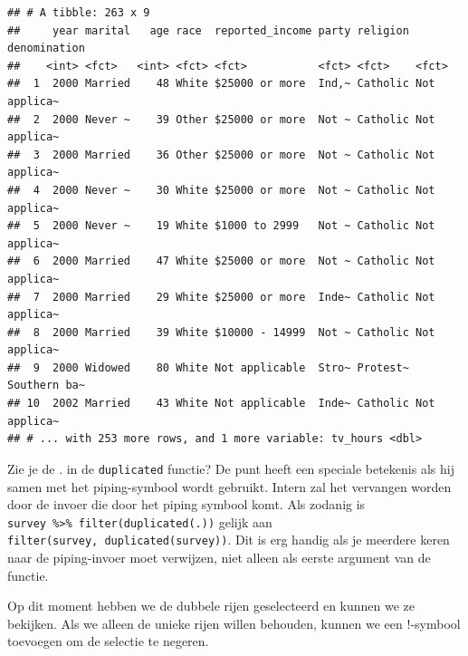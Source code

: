 \documentclass[]{tufte-book}
\newenvironment{Shaded}{}{}
\newcommand{\KeywordTok}[1]{\textcolor[rgb]{0.00,0.44,0.13}{\textbf{#1}}}
\newcommand{\NormalTok}[1]{#1}
\newcommand{\OperatorTok}[1]{\textcolor[rgb]{0.40,0.40,0.40}{#1}}
\newcommand{\StringTok}[1]{\textcolor[rgb]{0.25,0.44,0.63}{#1}}
\begin{document}
\begin{verbatim}
## # A tibble: 263 x 9
##     year marital   age race  reported_income party religion denomination
##    <int> <fct>   <int> <fct> <fct>           <fct> <fct>    <fct>       
##  1  2000 Married    48 White $25000 or more  Ind,~ Catholic Not applica~
##  2  2000 Never ~    39 Other $25000 or more  Not ~ Catholic Not applica~
##  3  2000 Married    36 Other $25000 or more  Not ~ Catholic Not applica~
##  4  2000 Never ~    30 White $25000 or more  Not ~ Catholic Not applica~
##  5  2000 Never ~    19 White $1000 to 2999   Not ~ Catholic Not applica~
##  6  2000 Married    47 White $25000 or more  Not ~ Catholic Not applica~
##  7  2000 Married    29 White $25000 or more  Inde~ Catholic Not applica~
##  8  2000 Married    39 White $10000 - 14999  Not ~ Catholic Not applica~
##  9  2000 Widowed    80 White Not applicable  Stro~ Protest~ Southern ba~
## 10  2002 Married    43 White Not applicable  Inde~ Catholic Not applica~
## # ... with 253 more rows, and 1 more variable: tv_hours <dbl>
\end{verbatim}

Zie je de . in de \texttt{duplicated} functie? De punt heeft een speciale betekenis als hij samen met het piping-symbool wordt gebruikt. Intern zal het vervangen worden door de invoer die door het piping symbool komt. Als zodanig is \texttt{survey\ \%\textgreater{}\%\ filter(duplicated(.))} gelijk aan \texttt{filter(survey,\ duplicated(survey))}. Dit is erg handig als je meerdere keren naar de piping-invoer moet verwijzen, niet alleen als eerste argument van de functie.

Op dit moment hebben we de dubbele rijen geselecteerd en kunnen we ze bekijken. Als we alleen de unieke rijen willen behouden, kunnen we een !-symbool toevoegen om de selectie te negeren.

\begin{Shaded}
\end{Shaded}
\end{document}
